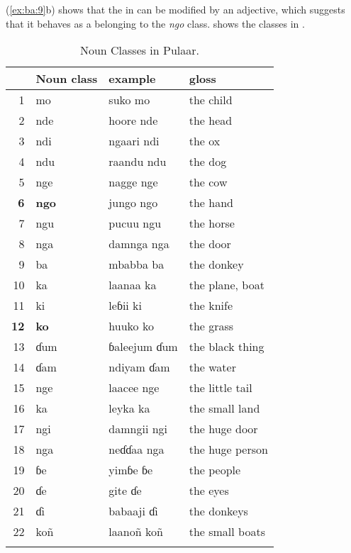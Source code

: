 \documentclass[output=paper,
modfonts
]{langscibook}
\begin{document}
(\ref{ex:ba:9}b) shows that the  in  can be modified by an adjective, which suggests that it behaves as a  belonging to the \textit{ngo} class.  shows the  classes in . 
 
\begin{table}
\begin{tabular}{rlll} 
\lsptoprule
& { {Noun class}}  & { {example}}  & { {gloss}} \\
\midrule
{  1} & { mo}  & { suko mo}  & { the child} \\
{  2} & { nde}  & { hoore nde}  & { the head} \\
{ 3} & { ndi}  & { ngaari ndi}  & { the ox} \\
{ 4} & { ndu}  & { raandu ndu}  & { the dog} \\
{ 5} & { nge}  & { nagge nge}  & { the cow} \\
{ \textbf{6}} & { \textbf{ngo}}  & { jungo ngo}  & { the hand} \\
{ 7} & { ngu}  & { pucuu ngu}  & { the horse} \\
{ 8} & { nga}  & { damnga nga}  & { the door} \\
{ 9} & { ba}  & { mbabba ba}  & { the donkey} \\
{ 10} & { ka}  & { laanaa ka}  & { the plane, boat} \\
{ 11} & { ki}  & { leɓii ki}  & { the knife} \\
{ \textbf{12}} & { \textbf{ko}}  & { huuko ko}  & { the grass} \\
{ 13} & { ɗum}  & { ɓaleejum ɗum}  & { the black thing} \\
{ 14} & { ɗam}  & { ndiyam ɗam}  & { the water} \\
{ 15} & { nge}  & { laacee nge}  & { the little tail} \\
{ 16} & { ka}  & { leyka ka}  & { the small land} \\
{ 17} & { ngi}  & { damngii ngi}  & { the huge door} \\
{ 18} & { nga}  & { neɗɗaa nga}  & { the huge person} \\
{ 19} & { ɓe} & { yimɓe ɓe} & { the people}\\
{ 20} & { ɗe} & { gite  ɗe} & { the eyes}\\
{ 21} & { ɗi} & { babaaji  ɗi} & { the donkeys}\\
{ 22} & { koñ} & { laanoñ  koñ} & { the small boats}\\
\lspbottomrule
\end{tabular}
\caption{Noun Classes in Pulaar.}
\label{tab:ba:1}
\end{table}
\end{document}
